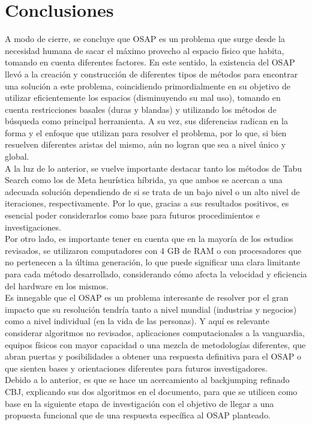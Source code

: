 \documentclass[letter, 10pt]{article}
\begin{document}
\section{Conclusiones}
A modo de cierre, se concluye que OSAP es un problema que surge desde la necesidad humana de sacar el m\'aximo provecho al espacio f\'isico que habita, tomando en cuenta diferentes factores. En este sentido, la existencia del OSAP llev\'o a la creaci\'on y construcci\'on de diferentes tipos de m\'etodos para encontrar una soluci\'on a este problema, coincidiendo primordialmente en su objetivo de utilizar eficientemente los espacios (disminuyendo su mal uso), tomando en cuenta restricciones basales (duras y blandas) y utilizando los m\'etodos de b\'usqueda como principal herramienta. A su vez, sus diferencias radican en la forma y el enfoque que utilizan para resolver el problema, por lo que, si bien resuelven diferentes aristas del mismo, a\'un no logran que sea a nivel \'unico y global. \\
A la luz de lo anterior, se vuelve importante destacar tanto los m\'etodos de Tabu Search como los de Meta heur\'istica h\'ibrida, ya que ambos se acercan a una adecuada soluci\'on dependiendo de si se trata de un bajo nivel o un alto nivel de iteraciones, respectivamente. Por lo que, gracias a sus resultados positivos, es esencial poder considerarlos como base para futuros procedimientos e investigaciones.\\
Por otro lado, es importante tener en cuenta que en la mayor\'ia de los estudios revisados, se utilizaron computadores con 4 GB de RAM o con procesadores que no pertenecen a la \'ultima generaci\'on, lo que puede significar una clara limitante para cada m\'etodo desarrollado, considerando c\'omo afecta la velocidad y eficiencia del hardware en los mismos. \\
Es innegable que el OSAP es un problema interesante de resolver por el gran impacto que su resoluci\'on tendr\'ia tanto a nivel mundial (industrias y negocios) como a nivel individual (en la vida de las personas). Y aqu\'i es relevante considerar algoritmos no revisados, aplicaciones computacionales a la vanguardia, equipos f\'isicos con mayor capacidad o una mezcla de metodolog\'ias diferentes, que abran puertas y posibilidades a obtener una respuesta definitiva para el OSAP o que sienten bases y orientaciones diferentes para futuros investigadores.\\
\noindent
Debido a lo anterior, es que se hace un acercamiento al backjumping refinado CBJ, explicando sus dos algoritmos en el documento,  para que se utilicen como base en la siguiente etapa de investigaci\'on con el objetivo de llegar a una propuesta funcional que de una respuesta espec\'ifica al OSAP planteado.
\end{document}
